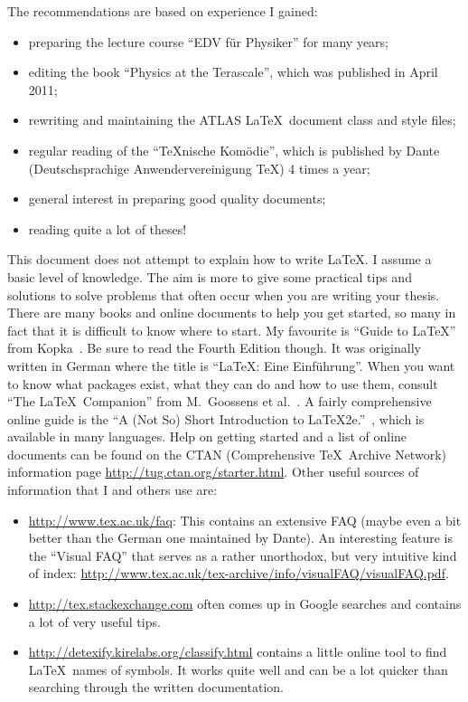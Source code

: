The recommendations are based on experience I gained:
\begin{itemize}
\item  preparing the
lecture course \foreignquote{ngerman}{EDV für Physiker} for many years;
\item editing the book \enquote{Physics at the Terascale}, which was
  published in April 2011;
\item rewriting and maintaining the ATLAS \LaTeX\ document class and style files;
\item regular reading of the \foreignquote{ngerman}{TeXnische Komödie},
  which is published by \foreignlanguage{ngerman}{Dante
    (Deutschsprachige Anwendervereinigung \TeX)} 4 times a year;
\item general interest in preparing good quality documents;
\item reading quite a lot of theses!
\end{itemize}

This document does not attempt to explain how to write \LaTeX. I
assume a basic level of knowledge. The aim is more to give some
practical tips and solutions to solve problems that often occur when
you are writing your thesis. There are many books and online documents
to help you get started, so many in fact that it is difficult to know
where to start. My favourite is \enquote{Guide to \LaTeX} from
Kopka~\cite{kopka04}. Be sure to read the Fourth Edition though. It
was originally written in German where the title is
\foreignquote{ngerman}{\LaTeX: Eine Einführung}. %
When you want to know
what packages exist, what they can do and how to use them, consult
\enquote{The \LaTeX\ Companion} from M.~Goossens et al.~\cite{goossens04}.
A fairly comprehensive online guide is the
\enquote{A (Not So) Short Introduction to LaTeX2e.}~\cite{lshort},
which is available in many languages.
Help on getting started and a list of online
documents can be found on the CTAN (Comprehensive \TeX\ Archive
Network) information page
\url{http://tug.ctan.org/starter.html}. Other useful sources of
information that I and others use are:
\begin{itemize}
\item \url{http://www.tex.ac.uk/faq}:
  This contains an extensive FAQ (maybe even a bit better than the German
  one maintained by Dante). An interesting feature is the \enquote{Visual FAQ}
  that serves as a rather unorthodox, but very intuitive kind of index:
  \url{http://www.tex.ac.uk/tex-archive/info/visualFAQ/visualFAQ.pdf}.
\item \url{http://tex.stackexchange.com} often comes up in Google
  searches and contains a lot of very useful tips.
\item \url{http://detexify.kirelabs.org/classify.html} contains a
  little online tool to find \LaTeX\ names of symbols. It works quite
  well and can be a lot quicker than searching through the written
  documentation.
\end{itemize}

